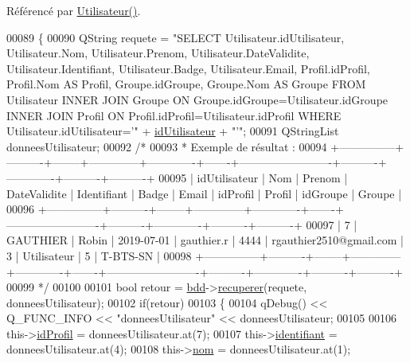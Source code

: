 Référencé par \hyperlink{class_utilisateur_aa11337e30b95db151312f65201c61199}{Utilisateur()}.


\begin{DoxyCode}
00089 \{
00090     QString requete = \textcolor{stringliteral}{"SELECT Utilisateur.idUtilisateur, Utilisateur.Nom, Utilisateur.Prenom,
       Utilisateur.DateValidite, Utilisateur.Identifiant, Utilisateur.Badge, Utilisateur.Email, Profil.idProfil, Profil.Nom AS
       Profil, Groupe.idGroupe, Groupe.Nom AS Groupe FROM Utilisateur INNER JOIN Groupe ON
       Groupe.idGroupe=Utilisateur.idGroupe INNER JOIN Profil ON Profil.idProfil=Utilisateur.idProfil WHERE Utilisateur.idUtilisateur='"} + 
      \hyperlink{class_utilisateur_ae1763e7a52c82c63506bc4160cdabb20}{idUtilisateur} + \textcolor{stringliteral}{"'"};
00091     QStringList donneesUtilisateur;
00092     \textcolor{comment}{/*}
00093 \textcolor{comment}{     * Exemple de résultat :}
00094 \textcolor{comment}{
      +---------------+----------+--------+--------------+-------------+-------+-------------------------+----------+-------------+----------+----------+}
00095 \textcolor{comment}{| idUtilisateur | Nom      | Prenom | DateValidite | Identifiant | Badge | Email                   |
       idProfil | Profil      | idGroupe | Groupe   |}
00096 \textcolor{comment}{
      +---------------+----------+--------+--------------+-------------+-------+-------------------------+----------+-------------+----------+----------+}
00097 \textcolor{comment}{|             7 | GAUTHIER | Robin  | 2019-07-01   | gauthier.r  | 4444  | rgauthier2510@gmail.com |       
       3 | Utilisateur |        5 | T-BTS-SN |}
00098 \textcolor{comment}{
      +---------------+----------+--------+--------------+-------------+-------+-------------------------+----------+-------------+----------+----------+}
00099 \textcolor{comment}{     */}
00100 
00101     \textcolor{keywordtype}{bool} retour = \hyperlink{class_utilisateur_a94fa14e95bd90358fb67eca0170e1724}{bdd}->\hyperlink{class_base_de_donnees_a77539baad389f5acf754cd2cd452403e}{recuperer}(requete, donneesUtilisateur);
00102     \textcolor{keywordflow}{if}(retour)
00103     \{
00104         qDebug() << Q\_FUNC\_INFO << \textcolor{stringliteral}{"donneesUtilisateur"} << donneesUtilisateur;
00105 
00106         this->\hyperlink{class_utilisateur_a042947e8b86637d1eb012c3fc89a959e}{idProfil} = donneesUtilisateur.at(7);
00107         this->\hyperlink{class_utilisateur_a1e79e47202a2c716346f47adbbeb2511}{identifiant} = donneesUtilisateur.at(4);
00108         this->\hyperlink{class_utilisateur_a1096e809aca4b7cf453a7af93cb72502}{nom} = donneesUtilisateur.at(1);

\end{DoxyCode}
